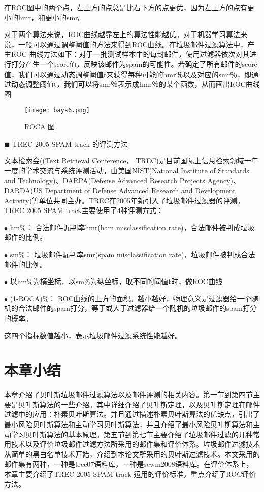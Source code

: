 在ROC图中的两个点，左上方的点总是比右下方的点更优，因为左上方的点有更小的hmr，和更小的smr。

对于两个算法来说，ROC曲线越靠左上的算法性能越优。对于机器学习算法来说，一般可以通过调整阈值的方法来得到ROC曲线。在垃圾邮件过滤算法中，产生ROC 曲线方法如下：对于一批测试样本中的每封邮件，使用过滤器依次对其进行打分产生一个score值，反映该邮件为spam的可能性。若确定了所有邮件的score值，我们可以通过动态调整阈值t来获得每种可能的hmr％以及对应的smr％，即通过动态调整阈值t，我们可以将smr％表示成hmr％的某个函数，从而画出ROC曲线图
\begin{figure}[htbp]
\centering
\texttt{[image: bays6.png]}
\caption{ROCA 图}
\label{fig:logo}
\end{figure}

$\blacksquare$ TREC 2005 SPAM track 的评测方法

文本检索会((Text Retrieval Conference， TREC)是目前国际上信息检索领域一年一度的学术交流与系统评测活动，由美国NIST(National Institute of Standards and Technology)、DARPA(Defense  Advanced  Research  Projects  Agency)、DARDA(US Department of Defense Advanced Research and Development Activity)等单位共同主办。TREC在2005年新引入了垃圾邮件过滤器的评测。TREC 2005 SPAM track主要使用了4种评测方式：

$\bullet$ hm\%： 合法邮件漏判率hmr(ham misclassification rate)，合法邮件被判成垃圾邮件的比例。

$\bullet$ sm\%：  垃圾邮件漏判率smr(spam misclassification rate)，垃圾邮件被判成合法邮件的比例。

$\bullet$ 以hm\%为横坐标，以sm\%为纵坐标，取不同的阈值t时，做ROC曲线

$\bullet$ (1-ROCA)\%： ROC曲线的上方的面积。越小越好，物理意义是过滤器给一个随机的合法邮件的spam打分，等于或大于过滤器给一个随机的垃圾邮件的spam打分的概率。

这四个指标数值越小，表示垃圾邮件过滤系统性能越好。


\section{本章小结}
本章介绍了贝叶斯垃圾邮件过滤算法以及邮件评测的相关内容。第一节到第四节主要是贝叶斯算法的一些介绍。其中详细介绍了贝叶斯定理，以及贝叶斯定理在邮件过滤中的应用：朴素贝叶斯算法。并且通过描述朴素贝叶斯算法的优缺点，引出了最小风险贝叶斯算法和主动学习贝叶斯算法，并且介绍了最小风险贝叶斯算法和主动学习贝叶斯算法的基本原理。第五节到第七节主要介绍了垃圾邮件过滤的几种常用技术以及评价垃圾邮件过滤方法所采用的邮件集和评价体系。垃圾邮件过滤技术从简单的黑白名单技术开始，介绍到本论文所采用的贝叶斯过滤技术。本文采用的邮件集有两种，一种是trec07语料库，一种是sewm2008语料库。在评价体系上，本章主要介绍了TREC 2005 SPAM track 运用的评价标准，重点介绍了ROC评价方法。







